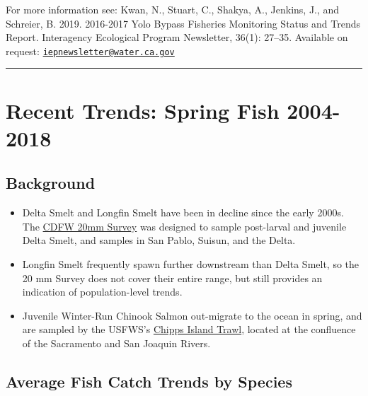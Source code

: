\documentclass[
]{book}
\providecommand{\tightlist}{%
  \setlength{\itemsep}{0pt}\setlength{\parskip}{0pt}}
\begin{document}
\begin{disclaimer}
For more information see: Kwan, N., Stuart, C., Shakya, A., Jenkins, J.,
and Schreier, B. 2019. 2016-2017 Yolo Bypass Fisheries Monitoring Status
and Trends Report. Interagency Ecological Program Newsletter, 36(1):
27--35. Available on request:
\href{mailto:iepnewsletter@water.ca.gov}{\nolinkurl{iepnewsletter@water.ca.gov}}
\end{disclaimer}

\begin{center}\rule{0.5\linewidth}{0.5pt}\end{center}

\hypertarget{recent-trends-spring-fish-2004-2018}{%
\section{Recent Trends: Spring Fish 2004-2018}\label{recent-trends-spring-fish-2004-2018}}

\hypertarget{background-5}{%
\subsection{Background}\label{background-5}}

\begin{itemize}
\tightlist
\item
  Delta Smelt and Longfin Smelt have been in decline since the early 2000s. The \href{https://wildlife.ca.gov/Conservation/Delta/20mm-Survey}{CDFW 20mm Survey} was designed to sample post-larval and juvenile Delta Smelt, and samples in San Pablo, Suisun, and the Delta.
\item
  Longfin Smelt frequently spawn further downstream than Delta Smelt, so the 20 mm Survey does not cover their entire range, but still provides an indication of population-level trends.
\item
  Juvenile Winter-Run Chinook Salmon out-migrate to the ocean in spring, and are sampled by the USFWS's \href{https://www.fws.gov/lodi/juvenile_fish_monitoring_program/jfmp_index.htm}{Chipps Island Trawl}, located at the confluence of the Sacramento and San Joaquin Rivers.
\end{itemize}

\hypertarget{average-fish-catch-trends-by-species-1}{%
\subsection{Average Fish Catch Trends by Species}\label{average-fish-catch-trends-by-species-1}}
\end{document}
